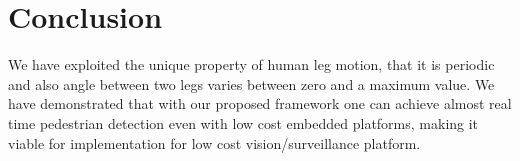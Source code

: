 \documentclass[conference]{IEEEtran}
\begin{document}
%





\section{Conclusion}

\indent We have exploited the unique property of human leg motion, that
it is periodic and also angle between two legs varies between zero and a
maximum value.  We have demonstrated that with our proposed framework
one can achieve almost real time pedestrian detection even with low cost
embedded platforms, making it viable for implementation for low cost
vision/surveillance platform.





\end{document}
